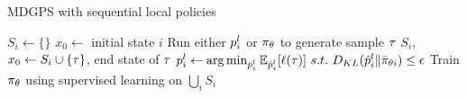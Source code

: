 \setlength{\textfloatsep}{12pt}
\begin{algorithm}[tb]
    \caption{MDGPS with sequential local policies}
    \label{alg:mdgpsseq}
    \begin{algorithmic}[1]
                \STATE $S_i\leftarrow\{\}$
                    \STATE $x_0\leftarrow$ initial state $i$
                        \STATE Run either $p_i^l$ or $\pi_{\theta}$ to
                        generate sample $\tau$
                        \STATE $S_i$, $x_0\leftarrow{S_i}\cup\{\tau\}$, end state of $\tau$
                    \ENDFOR
                \ENDFOR
                    \STATE $p_i^l\leftarrow\operatorname*{arg\,min}_{\hat{p}_i^l}\mathbb{E}_{\hat{p}_i^l}[\ell(\tau)]~s.t.~D_{KL}(\hat{p}_i^l\|\bar{\pi}_{\theta{i}})\leq\epsilon$
                \ENDFOR
            \ENDFOR
            \STATE Train $\pi_{\theta}$ using supervised learning on
            $\bigcup_iS_i$
        \ENDFOR
    \end{algorithmic}
\end{algorithm}





